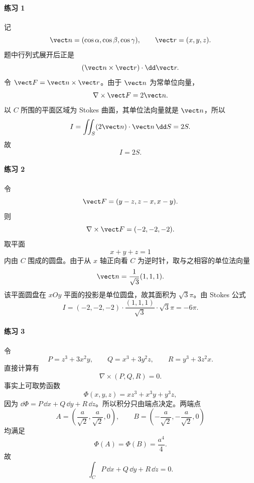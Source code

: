 \paragraph{练习 1}
\begin{xsolution}
记
\[
  \vect n=(\cos\alpha,\cos\beta,\cos\gamma),
  \qquad \vect r=(x,y,z).
\]
题中行列式展开后正是
\[
  (\vect n\times\vect r)\cdot\dd\vect r.
\]
令 $\vect F=\vect n\times\vect r$。由于 $\vect n$ 为常单位向量，
\[
  \nabla\times\vect F=2\vect n.
\]
以 $C$ 所围的平面区域为 Stokes 曲面，其单位法向量就是 $\vect n$，所以
\[
  I=\iint_S(2\vect n)\cdot\vect n\,\dd S=2S.
\]
故
\[
  \boxed{I=2S}.
\]
\end{xsolution}

\paragraph{练习 2}
\begin{xsolution}
令
\[
  \vect F=(y-z,z-x,x-y).
\]
则
\[
  \nabla\times\vect F=(-2,-2,-2).
\]
取平面
\[
  x+y+z=1
\]
内由 $C$ 围成的圆盘。由于从 $x$ 轴正向看 $C$ 为逆时针，取与之相容的单位法向量
\[
  \vect n=\frac1{\sqrt3}(1,1,1).
\]
该平面圆盘在 $xOy$ 平面的投影是单位圆盘，故其面积为 $\sqrt3\pi$。由 Stokes 公式
\[
  I=(-2,-2,-2)\cdot\frac{(1,1,1)}{\sqrt3}\cdot\sqrt3\pi
  =-6\pi.
\]
\end{xsolution}

\paragraph{练习 3}
\begin{xsolution}
令
\[
P=z^3+3x^2y,\qquad Q=x^3+3y^2z,\qquad R=y^3+3z^2x.
\]
直接计算有
\[
  \nabla\times(P,Q,R)=0.
\]
事实上可取势函数
\[
  \Phi(x,y,z)=xz^3+x^3y+y^3z,
\]
因为 $\dd\Phi=P\,\dd x+Q\,\dd y+R\,\dd z$。所以积分只由端点决定。两端点
\[
A=\left(\frac a{\sqrt2},\frac a{\sqrt2},0\right),
\qquad
B=\left(-\frac a{\sqrt2},-\frac a{\sqrt2},0\right)
\]
均满足
\[
  \Phi(A)=\Phi(B)=\frac{a^4}{4}.
\]
故
\[
  \boxed{\int_C P\,\dd x+Q\,\dd y+R\,\dd z=0}.
\]
\end{xsolution}


